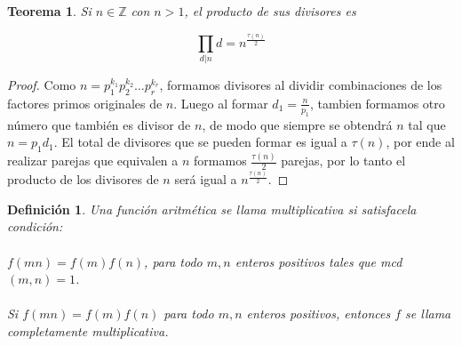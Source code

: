 \documentclass{article}
\newtheorem{theorem}{Teorema}[]
\newtheorem{definition}{Definición}[]
\begin{document}
\begin{theorem}
	Si $n \in \mathbb{Z}$ con $n>1$, el producto de sus divisores es
	
	$$\prod_{d|n} d = n^{\frac{\tau(n)}{2}}$$
\end{theorem}
\begin{proof}
	Como $n = p^{k_1}_1 p^{k_2}_2 \dots p^{k_r}_r$, formamos divisores al dividir combinaciones de los factores primos originales de $n$. Luego al formar $d_1 = \frac{n}{p_1}$, tambien formamos otro número que también es divisor de  $n$, de modo que siempre se obtendrá $n$ tal que $n = p_1 d_1$. El total de divisores que se pueden formar es igual a $\tau(n)$, por ende al realizar parejas que equivalen a $n$ formamos $\frac{\tau(n)}{2}$ parejas, por lo tanto el producto de los divisores de $n$ será igual a $n^{\frac{\tau(n)}{2}}$. 
\end{proof}

\begin{definition} \cite{rubiano2004}
	Una función aritmética se llama multiplicativa si satisfacela condición:
	
	\paragraph{} $f(mn) = f(m) f(n)$, para todo $m, n$ enteros positivos tales que mcd$(m,n) = 1$.
	
	\paragraph{}Si $f(mn) = f(m) f(n)$ para todo $m,n$ enteros positivos, entonces $f$ se llama completamente multiplicativa.
\end{definition}
\end{document}
